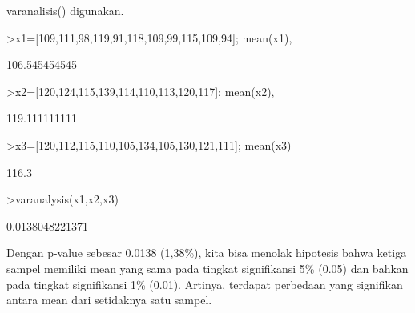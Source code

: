 \documentclass[a4paper,10pt]{article}
\begin{document}
\begin{eulernotebook}
\begin{eulercomment}
\begin{eulercomment}
\begin{eulercomment}
\begin{eulercomment}
\begin{eulercomment}
varanalisis() digunakan.
\end{eulercomment}
\begin{eulerprompt}
>x1=[109,111,98,119,91,118,109,99,115,109,94]; mean(x1),
\end{eulerprompt}
\begin{euleroutput}
  106.545454545
\end{euleroutput}
\begin{eulerprompt}
>x2=[120,124,115,139,114,110,113,120,117]; mean(x2),
\end{eulerprompt}
\begin{euleroutput}
  119.111111111
\end{euleroutput}
\begin{eulerprompt}
>x3=[120,112,115,110,105,134,105,130,121,111]; mean(x3)
\end{eulerprompt}
\begin{euleroutput}
  116.3
\end{euleroutput}
\begin{eulerprompt}
>varanalysis(x1,x2,x3)
\end{eulerprompt}
\begin{euleroutput}
  0.0138048221371
\end{euleroutput}
\begin{eulercomment}
Dengan p-value sebesar 0.0138 (1,38\%), kita bisa menolak hipotesis
bahwa ketiga sampel memiliki mean yang sama pada tingkat signifikansi
5\% (0.05) dan bahkan pada tingkat signifikansi 1\% (0.01). Artinya,
terdapat perbedaan yang signifikan antara mean dari setidaknya satu
sampel.


\end{eulercomment}
\end{eulercomment}
\end{eulercomment}
\end{eulercomment}
\end{eulercomment}
\end{eulernotebook}
\end{document}
